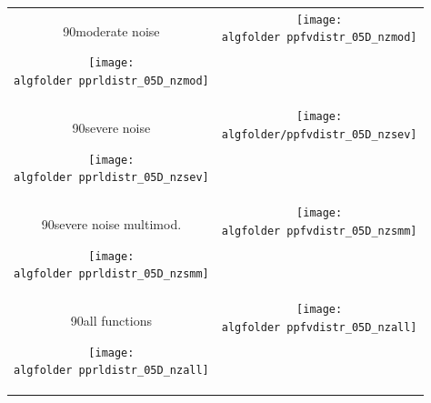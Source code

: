 \documentclass{article}
\newcommand{\Df}{\ensuremath{\Delta f}}
\newcommand{\fopt}{\ensuremath{f_\mathrm{opt}}}
\newcommand{\rot}[2][2.5]{
  \hspace*{-3.5\baselineskip}%
  \begin{rotate}{90}\hspace{#1em}#2
  \end{rotate}}
\begin{document}
\begin{figure}[htbp!]
\centering
\begin{tabular}{@{}c@{}c@{}}
\rot[2.]{moderate noise}
\texttt{[image: \\algfolder pprldistr\_05D\_nzmod]} &
\texttt{[image: \\algfolder ppfvdistr\_05D\_nzmod]}
\\[-1ex]
\rot[2.8]{severe noise}
\texttt{[image: \\algfolder pprldistr\_05D\_nzsev]} &
\texttt{[image: \\algfolder/ppfvdistr\_05D\_nzsev]}
\\[-1ex]
\rot[0.6]{severe noise multimod.}
\texttt{[image: \\algfolder pprldistr\_05D\_nzsmm]} &
\texttt{[image: \\algfolder ppfvdistr\_05D\_nzsmm]}\\[-1ex]
\rot[2.8]{all functions}
\texttt{[image: \\algfolder pprldistr\_05D\_nzall]} & 
\texttt{[image: \\algfolder ppfvdistr\_05D\_nzall]}
\end{tabular}
\vspace*{-2ex}
\caption{\label{fig:RLDs05D\algfolder}%
%
}
\end{figure}
\end{document}
